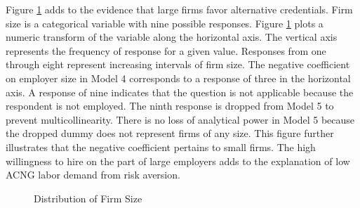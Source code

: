 Figure \ref{fig:firm_size} adds to the evidence that large firms favor alternative credentials.
Firm size is a categorical variable with nine possible responses.
Figure \ref{fig:firm_size} plots a numeric transform of the variable along the horizontal axis.
The vertical axis represents the frequency of response for a given value.
Responses from one through eight represent increasing intervals of firm size.
The negative coefficient on employer size in Model 4 corresponds to a response of three in the horizontal axis.
A response of nine indicates that the question is not applicable because the respondent is not employed.
The ninth response is dropped from Model 5 to prevent multicollinearity.
There is no loss of analytical power in Model 5 because the dropped dummy does not represent firms of any size.
This figure further illustrates that the negative coefficient pertains to small firms.
The high willingness to hire on the part of large employers adds to the explanation of low ACNG labor demand from risk aversion.

\begin{figure}[h!]
    \centering
    \caption{Distribution of Firm Size}
    \label{fig:firm_size}
\end{figure}

